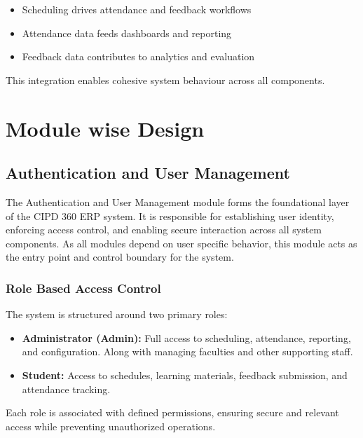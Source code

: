 \begin{itemize}
    \item Scheduling drives attendance and feedback workflows
    \item Attendance data feeds dashboards and reporting
    \item Feedback data contributes to analytics and evaluation
\end{itemize}

This integration enables cohesive system behaviour across all components.

\chapter{Module wise Design}{\label{ch:modules}}

\section{Authentication and User Management}

The Authentication and User Management module forms the foundational layer of the CIPD 360 ERP
system. It is responsible for establishing user identity, enforcing access control, and enabling secure
interaction across all system components. As all modules depend on user specific behavior, this
module acts as the entry point and control boundary for the system.

\subsection{Role Based Access Control}

The system is structured around two primary roles:

\begin{itemize}
    \item \textbf{Administrator (Admin):} Full access to scheduling, attendance, reporting, and configuration.
    Along with managing faculties and other supporting staff.
    \item \textbf{Student:} Access to schedules, learning materials, feedback submission, and attendance
    tracking.
\end{itemize}

Each role is associated with defined permissions, ensuring secure and relevant access while
preventing unauthorized operations.

